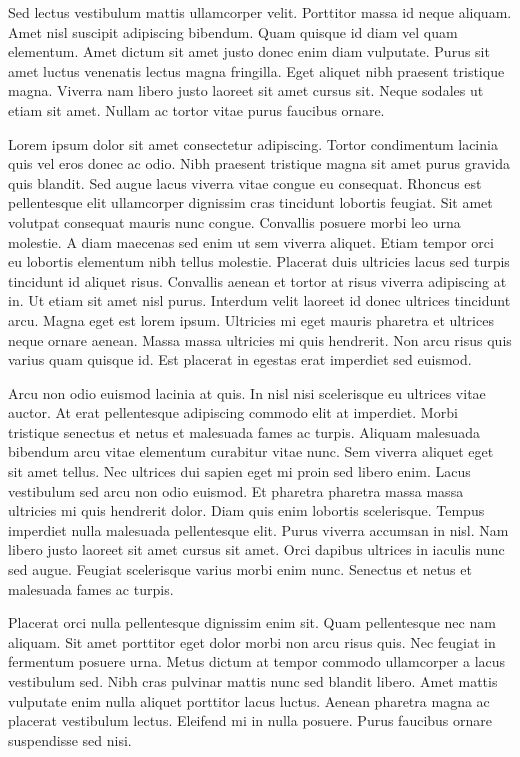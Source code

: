 \documentclass[conference]{IEEEtran}
\begin{document}
Sed lectus vestibulum mattis ullamcorper velit. Porttitor massa id neque aliquam. Amet nisl suscipit adipiscing bibendum. Quam quisque id diam vel quam elementum. Amet dictum sit amet justo donec enim diam vulputate. Purus sit amet luctus venenatis lectus magna fringilla. Eget aliquet nibh praesent tristique magna. Viverra nam libero justo laoreet sit amet cursus sit. Neque sodales ut etiam sit amet. Nullam ac tortor vitae purus faucibus ornare.

Lorem ipsum dolor sit amet consectetur adipiscing. Tortor condimentum lacinia quis vel eros donec ac odio. Nibh praesent tristique magna sit amet purus gravida quis blandit. Sed augue lacus viverra vitae congue eu consequat. Rhoncus est pellentesque elit ullamcorper dignissim cras tincidunt lobortis feugiat. Sit amet volutpat consequat mauris nunc congue. Convallis posuere morbi leo urna molestie. A diam maecenas sed enim ut sem viverra aliquet. Etiam tempor orci eu lobortis elementum nibh tellus molestie. Placerat duis ultricies lacus sed turpis tincidunt id aliquet risus. Convallis aenean et tortor at risus viverra adipiscing at in. Ut etiam sit amet nisl purus. Interdum velit laoreet id donec ultrices tincidunt arcu. Magna eget est lorem ipsum. Ultricies mi eget mauris pharetra et ultrices neque ornare aenean. Massa massa ultricies mi quis hendrerit. Non arcu risus quis varius quam quisque id. Est placerat in egestas erat imperdiet sed euismod.

Arcu non odio euismod lacinia at quis. In nisl nisi scelerisque eu ultrices vitae auctor. At erat pellentesque adipiscing commodo elit at imperdiet. Morbi tristique senectus et netus et malesuada fames ac turpis. Aliquam malesuada bibendum arcu vitae elementum curabitur vitae nunc. Sem viverra aliquet eget sit amet tellus. Nec ultrices dui sapien eget mi proin sed libero enim. Lacus vestibulum sed arcu non odio euismod. Et pharetra pharetra massa massa ultricies mi quis hendrerit dolor. Diam quis enim lobortis scelerisque. Tempus imperdiet nulla malesuada pellentesque elit. Purus viverra accumsan in nisl. Nam libero justo laoreet sit amet cursus sit amet. Orci dapibus ultrices in iaculis nunc sed augue. Feugiat scelerisque varius morbi enim nunc. Senectus et netus et malesuada fames ac turpis.

Placerat orci nulla pellentesque dignissim enim sit. Quam pellentesque nec nam aliquam. Sit amet porttitor eget dolor morbi non arcu risus quis. Nec feugiat in fermentum posuere urna. Metus dictum at tempor commodo ullamcorper a lacus vestibulum sed. Nibh cras pulvinar mattis nunc sed blandit libero. Amet mattis vulputate enim nulla aliquet porttitor lacus luctus. Aenean pharetra magna ac placerat vestibulum lectus. Eleifend mi in nulla posuere. Purus faucibus ornare suspendisse sed nisi.
\end{document}
